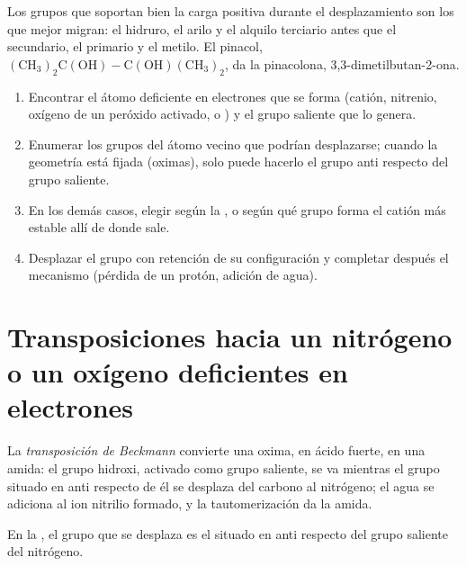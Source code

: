 Los grupos que soportan bien la carga positiva durante el desplazamiento son los que mejor migran: el hidruro,
el arilo y el alquilo terciario antes que el secundario, el primario y el metilo. El pinacol,
$\mathrm{(CH_3)_2C(OH){-}C(OH)(CH_3)_2}$, da la pinacolona, 3,3-dimetilbutan-2-ona.

\begin{method}\label{met:b3:radicals-carbenes:rearrangement}
\begin{enumerate}
  \item Encontrar el átomo deficiente en electrones que se forma (catión, nitrenio, oxígeno de un
        peróxido activado,  o ) y el grupo saliente que lo genera.
  \item Enumerar los grupos del átomo vecino que podrían desplazarse; cuando la
        geometría está fijada (oximas), solo puede hacerlo el grupo anti respecto del grupo saliente.
  \item En los demás casos, elegir según la , o según qué grupo forma el catión más
        estable allí de donde sale.
  \item Desplazar el grupo con retención de su configuración y completar después el
        mecanismo (pérdida de un protón, adición de agua).
\end{enumerate}
\end{method}

\section{Transposiciones hacia un nitrógeno o un oxígeno deficientes en electrones}

\begin{definition}\label{def:b3:radicals-carbenes:beckmann}
La \emph{transposición de Beckmann} convierte una oxima,
en ácido fuerte, en una amida: el grupo hidroxi, activado como grupo saliente,
se va mientras el grupo situado en anti respecto de él se desplaza del carbono al nitrógeno; el agua se adiciona
al ion nitrilio formado, y la tautomerización da la amida.
\end{definition}

\begin{proposition}\label{prop:b3:radicals-carbenes:beckmann-anti}
En la , el grupo que se desplaza es el situado en anti respecto del
grupo saliente del nitrógeno.
\end{proposition}

